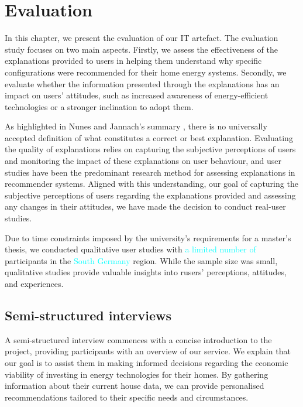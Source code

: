 \chapter{Evaluation}

In this chapter, we present the evaluation of our IT artefact. 
The evaluation study focuses on two main aspects. 
Firstly, we assess the effectiveness of the explanations provided to users in helping them understand why specific configurations were recommended for their home energy systems.
Secondly, we evaluate whether the information presented through the explanations has an impact on users' attitudes, such as increased awareness of energy-efficient technologies or a stronger inclination to adopt them. 
 
As highlighted in Nunes and Jannach's summary \cite{Nunes2020}, 
there is no universally accepted definition of what constitutes a correct or best explanation. 
Evaluating the quality of explanations relies on capturing the subjective perceptions of users and monitoring the impact of these explanations on user behaviour, 
and user studies have been the predominant research method for assessing explanations in recommender systems.
Aligned with this understanding, our goal of capturing the subjective perceptions of users regarding the explanations provided and assessing any changes in their attitudes, 
we have made the decision to conduct real-user studies. 

Due to time constraints imposed by the university's requirements for a master's thesis, we conducted qualitative user studies with \textcolor{cyan}{a limited number of} participants in the \textcolor{cyan}{South Germany} region. 
While the sample size was small, qualitative studies provide valuable insights into rusers' perceptions, attitudes, and experiences.


\section{Semi-structured interviews}

A semi-structured interview commences with a concise introduction to the project, providing participants with an overview of our service. 
We explain that our goal is to assist them in making informed decisions regarding the economic viability of investing in energy technologies for their homes. 
By gathering information about their current house data, we can provide personalised recommendations tailored to their specific needs and circumstances. 


